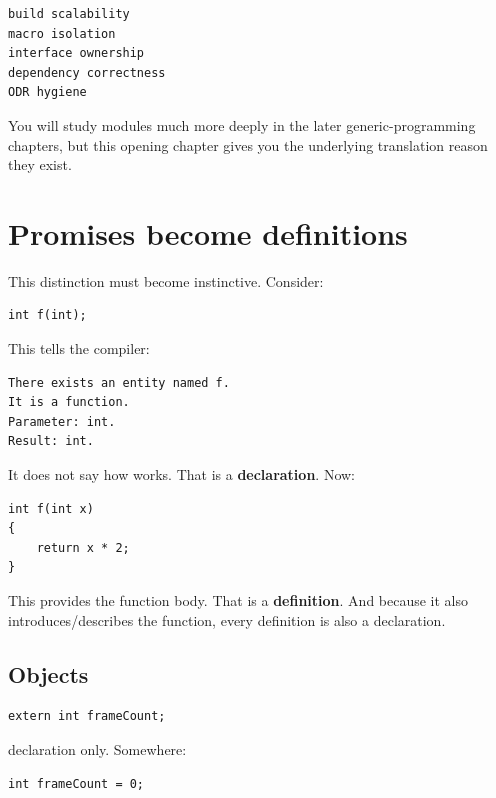 \begin{verbatim}
build scalability
macro isolation
interface ownership
dependency correctness
ODR hygiene
\end{verbatim}

You will study modules much more deeply in the later generic-programming chapters, but this opening chapter gives you the underlying translation reason they exist.

\section{Promises become definitions}\label{05-engine-i-ch002-promises-become-definitions}

\hypertarget{05-engine-i-ch002-promises-become-definitions}{}

This distinction must become instinctive. Consider:

\begin{verbatim}
int f(int);
\end{verbatim}

This tells the compiler:

\begin{verbatim}
There exists an entity named f.
It is a function.
Parameter: int.
Result: int.
\end{verbatim}

It does not say how  works. That is a \textbf{declaration}. Now:

\begin{verbatim}
int f(int x)
{
    return x * 2;
}
\end{verbatim}

This provides the function body. That is a \textbf{definition}. And because it also introduces/describes the function, every definition is also a declaration.

\subsection{Objects}\label{05-engine-i-ch002-objects}

\hypertarget{05-engine-i-ch002-objects}{}

\begin{verbatim}
extern int frameCount;
\end{verbatim}

declaration only. Somewhere:

\begin{verbatim}
int frameCount = 0;
\end{verbatim}

